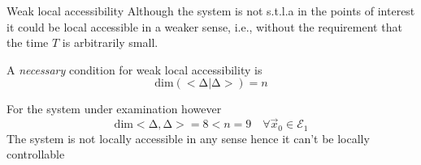 \begin{frame}{Weak local accessibility}
  Although the system is not s.t.l.a in the points of interest it could be local accessible
  in a weaker sense, i.e., without the requirement that the time $T$ is arbitrarily small.
  \par
  A \emph{necessary} condition for weak local accessibility is
  \[
  \mathrm{dim}(<\mathrm{\Delta}|\mathrm{\Delta}>) = n
  \]
  \par
  For the system under examination however
  \[
  \mathrm{dim} <\mathrm{\Delta},\mathrm{\Delta}> = 8 < n = 9
  \quad \forall \vec{x}_0 \in \mathcal{E}_1
  \]
  \alert{The system is not locally accessible in any sense hence it can't be locally controllable}
\end{frame}
